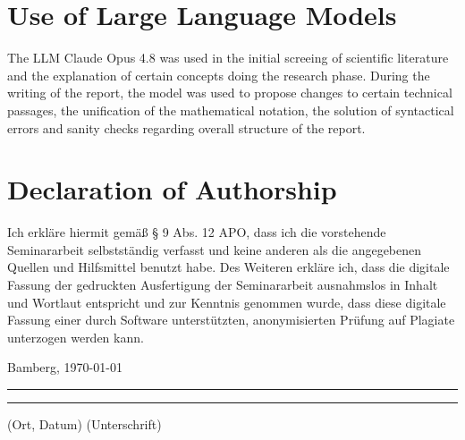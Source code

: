 \documentclass[a4paper]{article}
\begin{document}



\newpage
\section*{Use of Large Language Models}

The LLM Claude Opus 4.8 was used in the initial screeing of scientific literature and the explanation of certain concepts doing the research phase. During the writing of the report, the model was used to propose changes to certain technical passages, the unification of the mathematical notation, the solution of syntactical errors and sanity checks regarding overall structure of the report. 




{\parindent 0cm
\section*{Declaration of Authorship}
Ich erkläre hiermit gemäß § 9 Abs. 12 APO, dass ich die vorstehende Seminararbeit selbstständig verfasst und keine anderen als die angegebenen Quellen und Hilfsmittel benutzt habe. Des Weiteren erkläre ich, dass die digitale Fassung der gedruckten Ausfertigung der Seminararbeit ausnahmslos in Inhalt und Wortlaut entspricht und zur Kenntnis genommen wurde, dass diese digitale Fassung einer durch Software unterstützten, anonymisierten Prüfung auf Plagiate unterzogen werden kann.\\
\vspace{2\baselineskip}
  
Bamberg, \today

\rule[0.5em]{14em}{0.5pt} \hspace{0.25\linewidth}\rule[0.5em]{14em}{0.5pt}
\vspace{1em}
\hspace{4em} (Ort, Datum) \hspace{0.51\linewidth} (Unterschrift)
}
\end{document}

